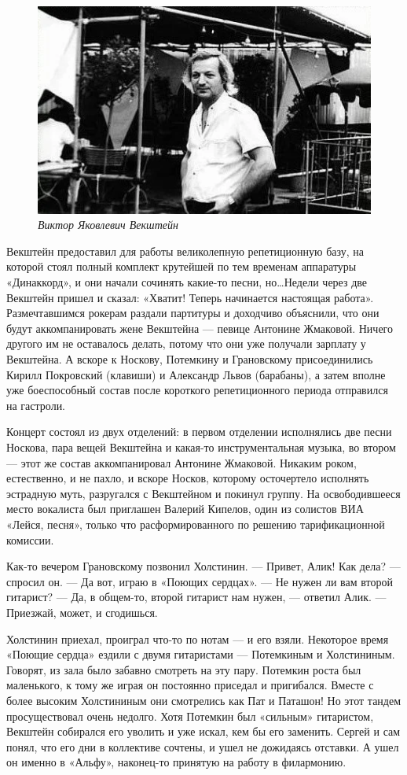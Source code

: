 \documentclass[16pt,a5paper,oneside]{book}
\begin{document}
\begin{figure}
    \centering
    \includegraphics[scale=0.9]{Image10}
    \caption{\textit{Виктор Яковлевич Векштейн}}
\end{figure}

Векштейн предоставил для работы великолепную репетиционную базу, на которой стоял полный комплект крутейшей по тем
временам аппаратуры «Динаккорд», и они начали сочинять какие-то песни, но\ldots Недели через две Векштейн пришел и
сказал: «Хватит! Теперь начинается настоящая работа». Размечтавшимся рокерам раздали партитуры и доходчиво объяснили,
что они будут аккомпанировать жене Векштейна — певице Антонине Жмаковой. Ничего другого им не оставалось делать, потому
что они уже получали зарплату у Векштейна. А вскоре к Носкову, Потемкину и Грановскому присоединились Кирилл Покровский
(клавиши) и Александр Львов (барабаны), а затем вполне уже боеспособный состав после короткого репетиционного периода
отправился на гастроли.

Концерт состоял из двух отделений: в первом отделении исполнялись две песни Носкова, пара вещей Векштейна и какая-то
инструментальная музыка, во втором — этот же состав аккомпанировал Антонине Жмаковой. Никаким роком, естественно, и не
пахло, и вскоре Носков, которому осточертело исполнять эстрадную муть, разругался с Векштейном и покинул группу. На
освободившееся место вокалиста был приглашен Валерий Кипелов, один из солистов ВИА «Лейся, песня», только что
расформированного по решению тарификационной комиссии.

Как-то вечером Грановскому позвонил Холстинин.
— Привет, Алик! Как дела? — спросил он.
— Да вот, играю в «Поющих сердцах».
— Не нужен ли вам второй гитарист?
— Да, в общем-то, второй гитарист нам нужен, — ответил Алик. — Приезжай, может, и сгодишься.

Холстинин приехал, проиграл что-то по нотам — и его взяли. Некоторое время «Поющие сердца» ездили с двумя гитаристами —
Потемкиным и Холстининым. Говорят, из зала было забавно смотреть на эту пару. Потемкин роста был маленького, к тому же
играя он постоянно приседал и пригибался. Вместе с более высоким Холстининым они смотрелись как Пат и Паташон! Но этот
тандем просуществовал очень недолго. Хотя Потемкин был «сильным» гитаристом, Векштейн собирался его уволить и уже искал,
кем бы его заменить. Сергей и сам понял, что его дни в коллективе сочтены, и ушел не дожидаясь отставки. А ушел он
именно в «Альфу», наконец-то принятую на работу в филармонию.
\end{document}
